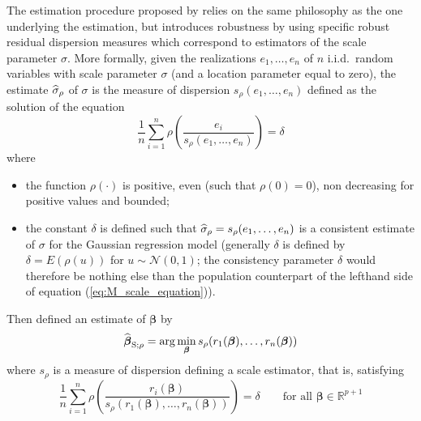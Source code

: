 The  estimation procedure proposed by \citet{rousseeuw:yohai:1984}
relies on the same philosophy as the one underlying the  estimation,
but introduces robustness by using specific robust residual dispersion measures
which correspond to  estimators of the scale parameter $\sigma$. More
formally, given the realizations $e_{1}, \dots, e_{n}$ of $n$ i.i.d.\ random
variables with scale parameter $\sigma$ (and a location parameter equal to
zero), the  estimate $\widehat{\sigma}_{\rho}$ of $\sigma$ is the
measure of dispersion $s_{\rho}(e_{1}, \dots, e_{n})$ defined as the solution
of the equation
%
\begin{equation}\label{eq:M_scale_equation}
    \frac{1}{n}\sum_{i=1}^{n} \rho\left(\frac{e_{i}}{s_{\rho}(e_{1}, \dots, e_{n})}\right) = \delta
\end{equation}
%
where
\begin{itemize}
    \item the function $\rho(\cdot)$ is positive, even (such that
    $\rho(0) = 0$), non decreasing for positive values and bounded;

    \item the constant $\delta$ is defined such that $\widehat{\sigma}_{\rho} =
    s_{\rho}(e_{1}, \dots, e_{n})$ is a consistent estimate of $\sigma$ for the
    Gaussian regression model (generally $\delta$ is defined by $\delta =
    E(\rho(u))$ for $u \sim \mathcal{N}(0,1)$; the consistency parameter
    $\delta$ would therefore be nothing else than the population counterpart of
    the lefthand side of equation (\ref{eq:M_scale_equation})).
\end{itemize}

Then \citet{rousseeuw:yohai:1984} defined an  estimate of
$\boldsymbol\beta$ by
\[
    \widehat{\boldsymbol\beta}_{\mathrm{S};\rho} 
    = \arg\min_{\boldsymbol\beta}s_{\rho} (r_{1}(\boldsymbol\beta), \dots, r_{n}(\boldsymbol{\beta}))
\]
where $s_{\rho}$ is a measure of dispersion defining a scale  estimator, that is,
satisfying
%
\begin{equation}\label{eq:M_scale_equation_res}
    \frac{1}{n}\sum_{i=1}^{n} \rho\left(\frac{r_{i}(\boldsymbol{\beta})}%
        {s_{\rho}(r_{1}(\boldsymbol\beta), \dots, r_{n}(\boldsymbol\beta))}\right) = \delta
    \qquad\text{for all $\boldsymbol\beta \in \mathbb{R}^{p+1}$}
\end{equation}


